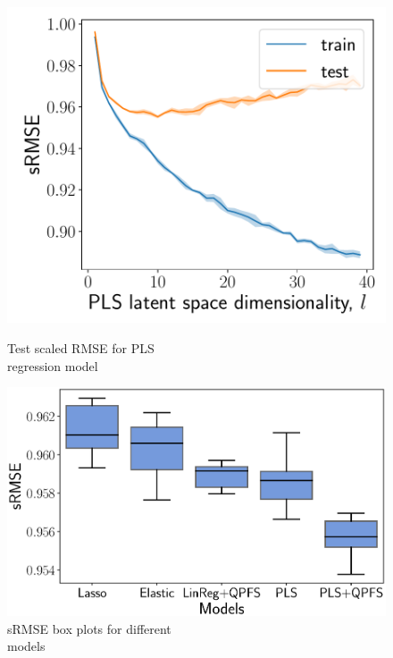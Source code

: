 \documentclass[12pt,twoside]{article}
\theoremstyle{definition}
\begin{document}
\begin{figure}[h]
	\begin{minipage}{.43\linewidth}
		\centering
		\includegraphics[width=1.\linewidth]{figs/pls_vs_k}
		\caption{Test scaled RMSE for PLS \\regression model}
		\label{fig:pls_vs_k}
	\end{minipage}%
	\begin{minipage}{.57\linewidth}
		\centering
		\includegraphics[width=1.\linewidth]{figs/models2}
		\caption{sRMSE box plots for different \\models}
		\label{fig:models}
	\end{minipage}
\end{figure}
\end{document}
